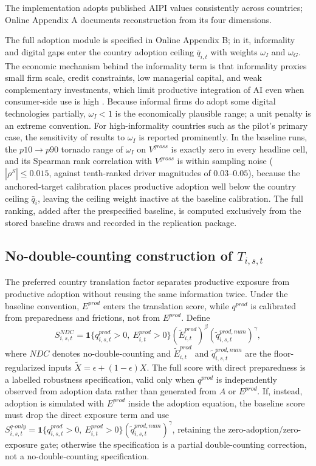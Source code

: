 \documentclass[11pt,a4paper]{article}
\begin{document}
The implementation adopts published AIPI values consistently across countries; Online Appendix A documents reconstruction from its four dimensions.


The full adoption module is specified in Online Appendix B; in it, informality and digital gaps enter the country adoption ceiling $\bar q_{i,t}$ with weights $\omega_I$ and $\omega_G$. The economic mechanism behind the informality term is that informality proxies small firm scale, credit constraints, low managerial capital, and weak complementary investments, which limit productive integration of AI even when consumer-side use is high \citep{worldbank2021informality}. Because informal firms do adopt some digital technologies partially, $\omega_I<1$ is the economically plausible range; a unit penalty is an extreme convention. For high-informality countries such as the pilot's primary case, the sensitivity of results to $\omega_I$ is reported prominently. In the baseline runs, the $p10\to p90$ tornado range of $\omega_I$ on $V^{gross}$ is exactly zero in every headline cell, and its Spearman rank correlation with $V^{gross}$ is within sampling noise ($|\rho^S|\leq0.015$, against tenth-ranked driver magnitudes of $0.03$--$0.05$), because the anchored-target calibration places productive adoption well below the country ceiling $\bar q_i$, leaving the ceiling weight inactive at the baseline calibration. The full ranking, added after the prespecified baseline, is computed exclusively from the stored baseline draws and recorded in the replication package.
\subsection[No-double-counting construction of T]{No-double-counting construction of $T_{i,s,t}$}\label{subsec:ndc_translation_main}

The preferred country translation factor separates productive exposure from productive adoption without reusing the same information twice. Under the baseline convention, $E^{prod}$ enters the translation score, while $q^{prod}$ is calibrated from preparedness and frictions, not from $E^{prod}$. Define
\begin{equation}\label{eq:S_ndc_main_v10}
    S^{NDC}_{i,s,t}=\mathbf{1}\{q^{prod}_{i,s,t}>0,\ E^{prod}_{i,t}>0\}(\tilde E^{prod}_{i,t})^{\beta}(\tilde q^{prod,num}_{i,s,t})^{\gamma},
\end{equation}
where $NDC$ denotes no-double-counting and $\tilde E^{prod}_{i,t}$ and $\tilde q^{prod,num}_{i,s,t}$ are the floor-regularized inputs $\tilde X=\epsilon+(1-\epsilon)X$. The full score with direct preparedness is a labelled robustness specification, valid only when $q^{prod}$ is independently observed from adoption data rather than generated from $A$ or $E^{prod}$.
If, instead, adoption is simulated with $E^{prod}$ inside the adoption equation, the baseline score must drop the direct exposure term and use $S^{q\text{-}only}_{i,s,t}=\mathbf{1}\{q^{prod}_{i,s,t}>0,\ E^{prod}_{i,t}>0\}(\tilde q^{prod,num}_{i,s,t})^{\gamma}$, retaining the zero-adoption/zero-exposure gate; otherwise the specification is a partial double-counting correction, not a no-double-counting specification.
\end{document}
